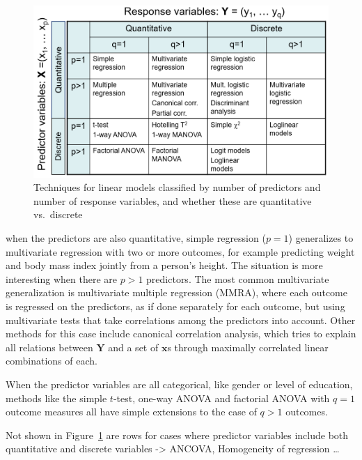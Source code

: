\documentclass[
  letterpaper,
  10pt,
  krantz2]{krantz}
\begin{document}
\begin{figure}

{\centering \includegraphics[width=1\textwidth,height=\textheight]{images/techniques-table.png}

}

\caption{\label{fig-techniques}Techniques for linear models classified
by number of predictors and number of response variables, and whether
these are quantitative vs.~discrete}

\end{figure}

when the predictors are also quantitative, simple regression (\(p=1\))
generalizes to multivariate regression with two or more outcomes, for
example predicting weight and body mass index jointly from a person's
height. The situation is more interesting when there are \(p>1\)
predictors. The most common multivariate generalization is multivariate
multiple regression (MMRA), where each outcome is regressed on the
predictors, as if done separately for each outcome, but using
multivariate tests that take correlations among the predictors into
account. Other methods for this case include canonical correlation
analysis, which tries to explain all relations between \(\mathbf{Y}\)
and a set of \(\mathbf{x}\)s through maximally correlated linear
combinations of each.

When the predictor variables are all categorical, like gender or level
of education, methods like the simple \(t\)-test, one-way ANOVA and
factorial ANOVA with \(q=1\) outcome measures all have simple extensions
to the case of \(q>1\) outcomes.

Not shown in Figure~\ref{fig-techniques} are rows for cases where
predictor variables include both quantitative and discrete variables
-\textgreater{} ANCOVA, Homogeneity of regression \ldots{}
\end{document}
